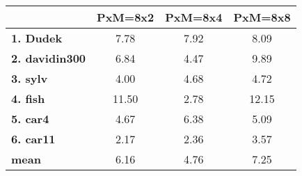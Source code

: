 \begin{tabular}{|l|c|c|c|}
\hline
&\textbf{PxM=8x2}&\textbf{PxM=8x4}&\textbf{PxM=8x8}\\\hline
\textbf{1. Dudek}&7.78&7.92&8.09\\\hline
\textbf{2. davidin300}&6.84&4.47&9.89\\\hline
\textbf{3. sylv}&4.00&4.68&4.72\\\hline
\textbf{4. fish}&11.50&2.78&12.15\\\hline
\textbf{5. car4}&4.67&6.38&5.09\\\hline
\textbf{6. car11}&2.17&2.36&3.57\\\hline
\textbf{mean}&6.16&4.76&7.25\\\hline
\end{tabular}
